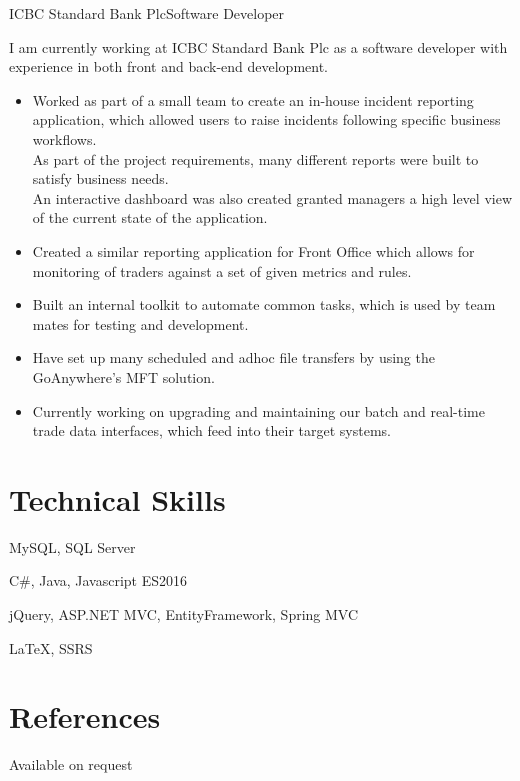 \documentclass[10pt,a4paper]{moderncv}
\begin{document}
{ICBC Standard Bank Plc}{Software Developer}{}{}
{
	I am currently working at ICBC Standard Bank Plc as a software developer with experience in both front and back-end development.
	\begin{itemize}
		\item Worked as part of a small team to create an in-house incident reporting application, which allowed users to raise incidents following specific business workflows.\\
		As part of the project requirements, many different reports were built to satisfy business needs.\\
		An interactive dashboard was also created granted managers a high level view of the current state of the application.\\
		\item Created a similar reporting application for Front Office which allows for monitoring of traders against a set of given metrics and rules.
		\item Built an internal toolkit to automate common tasks, which is used by team mates for testing and development.
		\item Have set up many scheduled and adhoc file transfers by using the GoAnywhere's MFT solution.
		\item Currently working on upgrading and maintaining our batch and real-time trade data interfaces, which feed into their target systems.
	\end{itemize}
}




\section{Technical Skills}
{MySQL, SQL Server}
{}
{}

{C\#, Java, Javascript ES2016}
{}
{}

{jQuery, ASP.NET MVC, EntityFramework, Spring MVC}
{}
{}

{LaTeX, SSRS}
{}
{}

\section{References}
\qquad \qquad \qquad \quad Available on request
\end{document}
